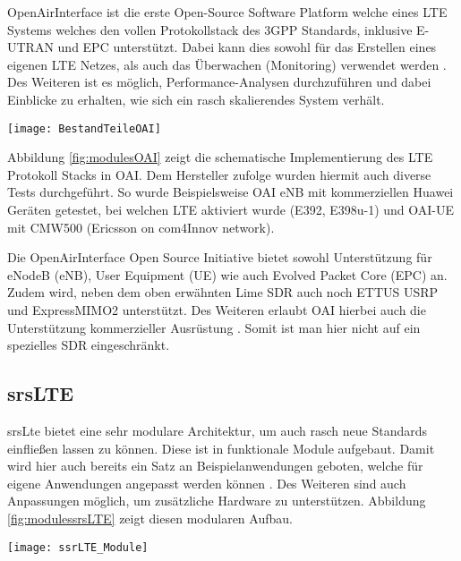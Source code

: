 OpenAirInterface ist die erste Open-Source Software Platform welche eines LTE Systems welches den vollen Protokollstack des 3GPP Standards, inklusive E-UTRAN und EPC unterstützt.
Dabei kann dies sowohl für das Erstellen eines eigenen LTE Netzes, als auch das Überwachen (Monitoring) verwendet werden \cite{nikaein2014openairinterface}.
Des Weiteren ist es möglich, Performance-Analysen durchzuführen und dabei Einblicke zu erhalten, wie sich ein rasch skalierendes System verhält. 

\begin{figure*}[ht]
	\centering
	\texttt{[image: BestandTeileOAI]}
	\caption{Übersicht LTE Module in den jeweiligen Projekten \protect\cite{openAirInterfaceOverview19}}
	\label{fig:modulesOAI}
\end{figure*}


Abbildung \ref{fig:modulesOAI} zeigt die schematische Implementierung des LTE Protokoll Stacks in OAI.
Dem Hersteller zufolge wurden hiermit auch diverse Tests durchgeführt. So wurde Beispielsweise OAI eNB mit kommerziellen Huawei Geräten getestet, bei welchen LTE aktiviert wurde (E392, E398u-1) und OAI-UE mit CMW500 (Ericsson on com4Innov network).

Die OpenAirInterface Open Source Initiative bietet sowohl Unterstützung für eNodeB (eNB), User Equipment (UE) wie auch Evolved Packet Core (EPC) an. Zudem wird, neben dem oben erwähnten Lime SDR auch noch ETTUS  USRP und ExpressMIMO2 unterstützt. Des Weiteren erlaubt OAI hierbei auch die Unterstützung kommerzieller Ausrüstung \cite{kaltenberger2019openairinterface}. Somit ist man hier nicht auf ein spezielles SDR eingeschränkt.

\subsection{srsLTE}
srsLte bietet eine sehr modulare Architektur, um auch rasch neue Standards einfließen lassen zu können. Diese ist in funktionale Module aufgebaut. Damit wird hier auch bereits ein Satz an Beispielanwendungen geboten, welche für eigene Anwendungen angepasst werden können \cite{puschmann2017implementing}. 
Des Weiteren sind auch Anpassungen möglich, um zusätzliche Hardware zu unterstützen. 
Abbildung \ref{fig:modulessrsLTE} zeigt diesen modularen Aufbau.

\begin{figure*}[ht]
	\centering
	\texttt{[image: ssrLTE\_Module]}
	\caption{Übersicht Architektur srsLTE \protect\cite{puschmann2017implementing}}
	\label{fig:modulessrsLTE}
\end{figure*}

